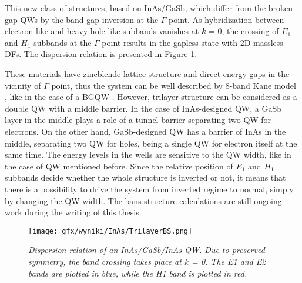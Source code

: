 \documentclass[titlepage,a4paper]{book}
\begin{document}
This new class of structures, based on InAs/GaSb, which differ from the broken-gap QWs by the band-gap inversion at the $\Gamma$ point. As hybridization between electron-like and heavy-hole-like subbands vanishes at \textbf{\textit{k}} = 0, the crossing of $E_1$ and $H_1$ subbands at the $\Gamma$ point results in the gapless state with 2D massless DFs. The dispersion relation is presented in Figure \ref{fig:TrilayerBandStructure2}.

These materials have zincblende lattice structure and direct energy gaps in the vicinity of $\Gamma$ point, thus the system can be well described by 8-band Kane model \cite{Kane_Model}, like in the case of a BGQW \cite{Liu_Topology}. However, trilayer structure can be considered as a double QW with a middle barrier. In the case of InAs-designed QW, a GaSb layer in the middle plays a role of a tunnel barrier separating two QW for electrons. On the other hand, GaSb-designed QW has a barrier of InAs in the middle, separating two QW for holes, being a single QW for electron itself at the same time. The energy levels in the wells are sensitive to the QW width, like in the case of QW mentioned before. Since the relative position of $E_1$ and $H_1$ subbands decide whether the whole structure is inverted or not, it means that there is a possibility to drive the system from inverted regime to normal, simply by changing the QW width. The bans structure calculations are still ongoing work during the writing of this thesis.

\begin{figure}[H]
	\centering
	\texttt{[image: gfx/wyniki/InAs/TrilayerBS.png]}
	\vspace{-10pt}
	\caption{\textit{Dispersion relation of an InAs/GaSb/InAs QW. Due to preserved symmetry, the band crossing takes place at $k$ = 0. The E1 and E2 bands are plotted in blue, while the H1 band is plotted in red.}}
	\label{fig:TrilayerBandStructure2}
\end{figure} 





\end{document}
